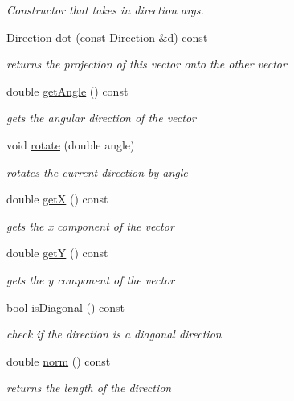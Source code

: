 \begin{DoxyCompactItemize}
\begin{DoxyCompactList}\small\item\em \-Constructor that takes in direction args. \end{DoxyCompactList}\item 
\hyperlink{class_direction}{\-Direction} \hyperlink{class_direction_a675daed393d6147323e5e589df557999}{dot} (const \hyperlink{class_direction}{\-Direction} \&d) const 
\begin{DoxyCompactList}\small\item\em returns the projection of this vector onto the other vector \end{DoxyCompactList}\item 
double \hyperlink{class_direction_a861e9d6fc32edf132879a39798c88c97}{get\-Angle} () const 
\begin{DoxyCompactList}\small\item\em gets the angular direction of the vector \end{DoxyCompactList}\item 
void \hyperlink{class_direction_a2f492b12e0bdf68553a4507c480da1a7}{rotate} (double angle)
\begin{DoxyCompactList}\small\item\em rotates the current direction by angle \end{DoxyCompactList}\item 
double \hyperlink{class_direction_ab93777499ea06f7085ad13e2f5086ee3}{get\-X} () const 
\begin{DoxyCompactList}\small\item\em gets the x component of the vector \end{DoxyCompactList}\item 
double \hyperlink{class_direction_a4656656ec5200fef9270fc1d6b30954a}{get\-Y} () const 
\begin{DoxyCompactList}\small\item\em gets the y component of the vector \end{DoxyCompactList}\item 
bool \hyperlink{class_direction_a03fcabe30cb42a95dba773e05c467a28}{is\-Diagonal} () const 
\begin{DoxyCompactList}\small\item\em check if the direction is a diagonal direction \end{DoxyCompactList}\item 
double \hyperlink{class_direction_adce8bde567dc4c84b2fe9b1e089c0f1e}{norm} () const 
\begin{DoxyCompactList}\small\item\em returns the length of the direction \end{DoxyCompactList}\end{DoxyCompactItemize}


